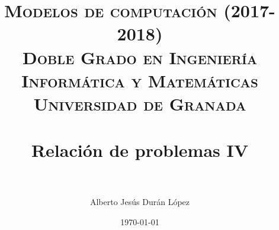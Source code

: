 


\title{	
	\normalfont \normalsize 
	\textsc{\textbf{Modelos de computación (2017-2018)} \\ Doble Grado en Ingeniería Informática y Matemáticas \\ Universidad de Granada} \\ [25pt] 
	\horrule{0.5pt} \\[0.4cm]
	\huge Relación de problemas IV \\ 
	\horrule{2pt} \\[0.5cm] 
}

\author{Alberto Jesús Durán López} 
\date{\normalsize\today} %



	\maketitle       %
	\newpage 
	\newpage
	



